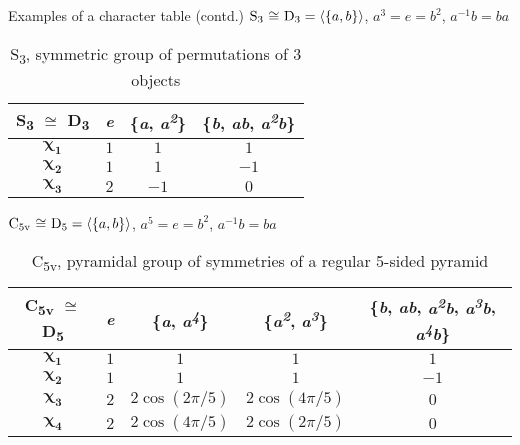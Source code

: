 \documentclass{beamer}
\begin{document}
\begin{frame}{Examples of a character table (contd.)}
    \centering
    $\text{S\textsubscript{3} $\cong$ D\textsubscript{3}}=\langle\{a,b\}\rangle$, $a^3=e=b^2$, $a^{-1}b=ba$
    \begin{table}[]
        \centering
        \setlength\extrarowheight{3pt}
        \begin{tabular}{|c|c|c|c|}
            \hline\textbf{S\textsubscript{3} $\cong$ D\textsubscript{3}} & \textbf{\textit{e}} & \textbf{\{\textit{a}, \textit{a\textsuperscript{2}}\}} & \textbf{\{\textit{b}, \textit{ab}, \textit{a\textsuperscript{2}b}\}} \\ \hline
            $\boldsymbol{\chi_1}$ & $1$ & $1$ & $1$ \\ \hline
            $\boldsymbol{\chi_2}$ & $1$ & $1$ & $-1$ \\ \hline
            $\boldsymbol{\chi_3}$ & $2$ & $-1$ & $0$ \\ \hline
        \end{tabular}
        \caption{S\textsubscript{3}, symmetric group of permutations of 3 objects}
    \end{table}
    \vspace{-0.5em}
    \centering
    $\text{C\textsubscript{5v} $\cong$ D\textsubscript{5}}=\langle\{a,b\}\rangle$, $a^5=e=b^2$, $a^{-1}b=ba$
    \begin{table}[]
        \centering
        \setlength\extrarowheight{3pt}
        \begin{tabular}{|c|c|c|c|c|}
            \hline\textbf{C\textsubscript{5v} $\cong$ D\textsubscript{5}} & \textbf{\textit{e}} & \textbf{\{\textit{a}, \textit{a\textsuperscript{4}}\}} & \textbf{\{\textit{a\textsuperscript{2}}, \textit{a\textsuperscript{3}}\}} & \textbf{\{\textit{b}, \textit{ab}, \textit{a\textsuperscript{2}b}, \textit{a\textsuperscript{3}b}, \textit{a\textsuperscript{4}b}\}} \\ \hline
            $\boldsymbol{\chi_1}$ & $1$ & $1$ & $1$ & $1$ \\ \hline
            $\boldsymbol{\chi_2}$ & $1$ & $1$ & $1$ & $-1$ \\ \hline
            $\boldsymbol{\chi_3}$ & $2$ & $2\cos(2\pi/5)$ & $2\cos(4\pi/5)$ & $0$ \\ \hline
            $\boldsymbol{\chi_4}$ & $2$ & $2\cos(4\pi/5)$ & $2\cos(2\pi/5)$ & $0$ \\ \hline
        \end{tabular}
        \caption{C\textsubscript{5v}, pyramidal group of symmetries of a regular 5-sided pyramid}
    \end{table}
\end{frame}
\end{document}
